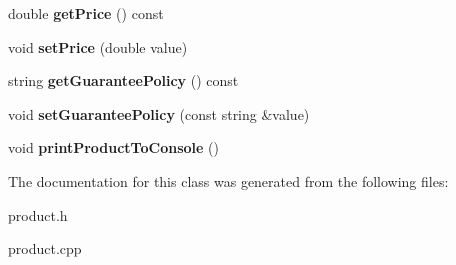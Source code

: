 \begin{DoxyCompactItemize}
\item 
\mbox{\label{class_product_a3be25f647260d61df6063ef706261c7f}} 
double {\bfseries get\+Price} () const
\item 
\mbox{\label{class_product_a880d0c12be98df933fc3a2e79fc33b0c}} 
void {\bfseries set\+Price} (double value)
\item 
\mbox{\label{class_product_ada216ca828762d3ec195f887980d639a}} 
string {\bfseries get\+Guarantee\+Policy} () const
\item 
\mbox{\label{class_product_a16f74fa9674713c06b53d39f9ea4b719}} 
void {\bfseries set\+Guarantee\+Policy} (const string \&value)
\item 
\mbox{\label{class_product_a2767727f5752c24d7bdb7b5af96f61a2}} 
void {\bfseries print\+Product\+To\+Console} ()
\end{DoxyCompactItemize}


The documentation for this class was generated from the following files\+:\begin{DoxyCompactItemize}
\item 
product.\+h\item 
product.\+cpp\end{DoxyCompactItemize}
